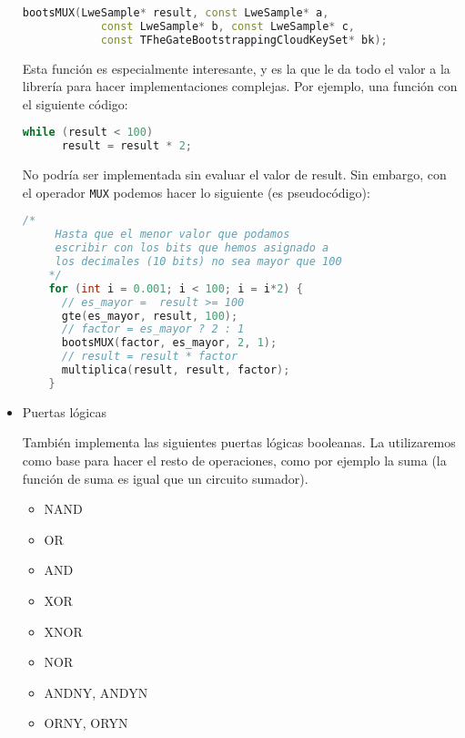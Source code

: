 \begin{itemize}
  \begin{lstlisting}[language=c++]
    bootsMUX(LweSample* result, const LweSample* a,
            const LweSample* b, const LweSample* c,
            const TFheGateBootstrappingCloudKeySet* bk);
  \end{lstlisting}

  Esta función es especialmente interesante, y es la que le da todo el valor a la librería para hacer implementaciones complejas. Por ejemplo, una función con el siguiente código:

  \begin{lstlisting}[language=c++]
    while (result < 100)
      result = result * 2;
  \end{lstlisting}

  No podría ser implementada sin evaluar el valor de result. Sin embargo, con el operador \verb|MUX| podemos hacer lo siguiente (es pseudocódigo):

  \begin{lstlisting}[language=c++]
    /*
     Hasta que el menor valor que podamos
     escribir con los bits que hemos asignado a
     los decimales (10 bits) no sea mayor que 100
    */
    for (int i = 0.001; i < 100; i = i*2) {
      // es_mayor =  result >= 100
      gte(es_mayor, result, 100);
      // factor = es_mayor ? 2 : 1
      bootsMUX(factor, es_mayor, 2, 1);
      // result = result * factor
      multiplica(result, result, factor);
    }
  \end{lstlisting}

  \item Puertas lógicas

  También implementa las siguientes puertas lógicas booleanas. La utilizaremos como base para hacer el resto de operaciones, como por ejemplo la suma (la función de suma es igual que un circuito sumador).

  \begin{itemize}
    \item NAND

    \item OR

    \item AND

    \item XOR

    \item XNOR

    \item NOR

    \item ANDNY, ANDYN

    \item ORNY, ORYN

  \end{itemize}

\end{itemize}

